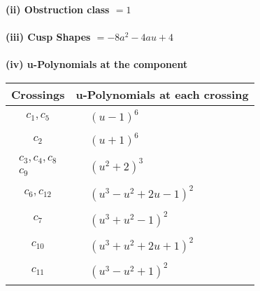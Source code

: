 \documentclass[1p]{elsarticle_modified}
\theoremstyle{definition}
\begin{document}
\flushleft \textbf{(ii) Obstruction class $= 1$}\\~\\
\flushleft \textbf{(iii) Cusp Shapes $= -8 a^2-4 a u+4$}\\~\\
\newpage\renewcommand{\arraystretch}{1}
\flushleft \textbf{(iv) u-Polynomials at the component}\newline \\
\begin{tabular}{m{50pt}|m{274pt}}
Crossings & \hspace{64pt}u-Polynomials at each crossing \\
\hline $$\begin{aligned}c_{1},c_{5}\end{aligned}$$&$\begin{aligned}
&(u-1)^6
\end{aligned}$\\
\hline $$\begin{aligned}c_{2}\end{aligned}$$&$\begin{aligned}
&(u+1)^6
\end{aligned}$\\
\hline $$\begin{aligned}c_{3},c_{4},c_{8}\\c_{9}\end{aligned}$$&$\begin{aligned}
&(u^2+2)^3
\end{aligned}$\\
\hline $$\begin{aligned}c_{6},c_{12}\end{aligned}$$&$\begin{aligned}
&(u^3- u^2+2 u-1)^2
\end{aligned}$\\
\hline $$\begin{aligned}c_{7}\end{aligned}$$&$\begin{aligned}
&(u^3+u^2-1)^2
\end{aligned}$\\
\hline $$\begin{aligned}c_{10}\end{aligned}$$&$\begin{aligned}
&(u^3+u^2+2 u+1)^2
\end{aligned}$\\
\hline $$\begin{aligned}c_{11}\end{aligned}$$&$\begin{aligned}
&(u^3- u^2+1)^2
\end{aligned}$\\
\hline
\end{tabular}\\~\\
\end{document}
